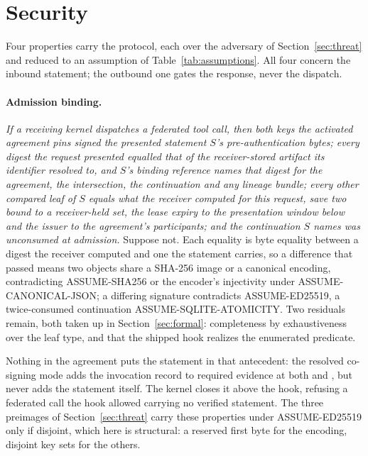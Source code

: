 \section{Security}
\label{sec:security}

Four properties carry the protocol, each over the adversary of
Section~\ref{sec:threat} and reduced to an assumption of
Table~\ref{tab:assumptions}. All four concern the inbound statement; the
outbound one gates the response, never the dispatch.

\paragraph{Admission binding.}
\emph{If a receiving kernel dispatches a federated tool call, then both keys
the activated agreement pins signed the presented statement $S$'s
pre-authentication bytes; every digest the request presented equalled that of
the receiver-stored artifact its identifier resolved to, and $S$'s binding
reference names that digest for the agreement, the intersection, the
continuation and any lineage bundle; every other compared leaf of $S$ equals
what the receiver computed for this request, save two bound to a receiver-held
set, the lease expiry to the presentation window below and the issuer to the
agreement's participants; and the continuation $S$ names was unconsumed at
admission.}
Suppose not. Each equality is byte equality between a digest the receiver
computed and one the statement carries, so a difference that passed means two
objects share a SHA-256 image or a canonical encoding, contradicting
ASSUME-SHA256 or the encoder's injectivity under ASSUME-CANONICAL-JSON; a
differing signature contradicts ASSUME-ED25519, a twice-consumed continuation
ASSUME-SQLITE-ATOMICITY. Two residuals remain, both taken up in
Section~\ref{sec:formal}: completeness by exhaustiveness over the leaf type,
and that the shipped hook realizes the enumerated predicate.

Nothing in the agreement puts the statement in that antecedent: the resolved
co-signing mode adds the invocation record to required evidence at both
 and , but never adds
the statement itself. The kernel
closes it above the hook, refusing a federated call the hook allowed carrying
no verified statement. The three preimages of Section~\ref{sec:threat} carry
these properties under ASSUME-ED25519 only if disjoint, which here is
structural: a reserved first byte for the encoding, disjoint key sets for the
others.

